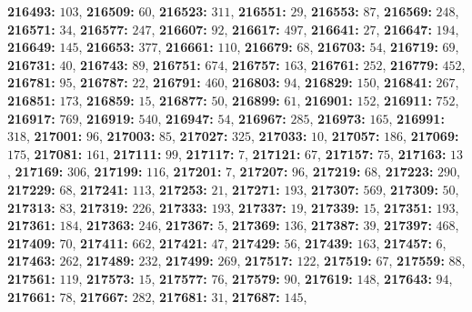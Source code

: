 \textsf{\bfseries 216493:} $103$, \textsf{\bfseries 216509:} $60$, \textsf{\bfseries 216523:} $311$, \textsf{\bfseries 216551:} $29$, \textsf{\bfseries 216553:} $87$, \textsf{\bfseries 216569:} $248$, \textsf{\bfseries 216571:} $34$, \textsf{\bfseries 216577:} $247$, \textsf{\bfseries 216607:} $92$, \textsf{\bfseries 216617:} $497$, \textsf{\bfseries 216641:} $27$, \textsf{\bfseries 216647:} $194$, \textsf{\bfseries 216649:} $145$, \textsf{\bfseries 216653:} $377$, \textsf{\bfseries 216661:} $110$, \textsf{\bfseries 216679:} $68$, \textsf{\bfseries 216703:} $54$, \textsf{\bfseries 216719:} $69$, \textsf{\bfseries 216731:} $40$, \textsf{\bfseries 216743:} $89$, \textsf{\bfseries 216751:} $674$, \textsf{\bfseries 216757:} $163$, \textsf{\bfseries 216761:} $252$, \textsf{\bfseries 216779:} $452$, \textsf{\bfseries 216781:} $95$, \textsf{\bfseries 216787:} $22$, \textsf{\bfseries 216791:} $460$, \textsf{\bfseries 216803:} $94$, \textsf{\bfseries 216829:} $150$, \textsf{\bfseries 216841:} $267$, \textsf{\bfseries 216851:} $173$, \textsf{\bfseries 216859:} $15$, \textsf{\bfseries 216877:} $50$, \textsf{\bfseries 216899:} $61$, \textsf{\bfseries 216901:} $152$, \textsf{\bfseries 216911:} $752$, \textsf{\bfseries 216917:} $769$, \textsf{\bfseries 216919:} $540$, \textsf{\bfseries 216947:} $54$, \textsf{\bfseries 216967:} $285$, \textsf{\bfseries 216973:} $165$, \textsf{\bfseries 216991:} $318$, \textsf{\bfseries 217001:} $96$, \textsf{\bfseries 217003:} $85$, \textsf{\bfseries 217027:} $325$, \textsf{\bfseries 217033:} $10$, \textsf{\bfseries 217057:} $186$, \textsf{\bfseries 217069:} $175$, \textsf{\bfseries 217081:} $161$, \textsf{\bfseries 217111:} $99$, \textsf{\bfseries 217117:} $7$, \textsf{\bfseries 217121:} $67$, \textsf{\bfseries 217157:} $75$, \textsf{\bfseries 217163:} $13$, \textsf{\bfseries 217169:} $306$, \textsf{\bfseries 217199:} $116$, \textsf{\bfseries 217201:} $7$, \textsf{\bfseries 217207:} $96$, \textsf{\bfseries 217219:} $68$, \textsf{\bfseries 217223:} $290$, \textsf{\bfseries 217229:} $68$, \textsf{\bfseries 217241:} $113$, \textsf{\bfseries 217253:} $21$, \textsf{\bfseries 217271:} $193$, \textsf{\bfseries 217307:} $569$, \textsf{\bfseries 217309:} $50$, \textsf{\bfseries 217313:} $83$, \textsf{\bfseries 217319:} $226$, \textsf{\bfseries 217333:} $193$, \textsf{\bfseries 217337:} $19$, \textsf{\bfseries 217339:} $15$, \textsf{\bfseries 217351:} $193$, \textsf{\bfseries 217361:} $184$, \textsf{\bfseries 217363:} $246$, \textsf{\bfseries 217367:} $5$, \textsf{\bfseries 217369:} $136$, \textsf{\bfseries 217387:} $39$, \textsf{\bfseries 217397:} $468$, \textsf{\bfseries 217409:} $70$, \textsf{\bfseries 217411:} $662$, \textsf{\bfseries 217421:} $47$, \textsf{\bfseries 217429:} $56$, \textsf{\bfseries 217439:} $163$, \textsf{\bfseries 217457:} $6$, \textsf{\bfseries 217463:} $262$, \textsf{\bfseries 217489:} $232$, \textsf{\bfseries 217499:} $269$, \textsf{\bfseries 217517:} $122$, \textsf{\bfseries 217519:} $67$, \textsf{\bfseries 217559:} $88$, \textsf{\bfseries 217561:} $119$, \textsf{\bfseries 217573:} $15$, \textsf{\bfseries 217577:} $76$, \textsf{\bfseries 217579:} $90$, \textsf{\bfseries 217619:} $148$, \textsf{\bfseries 217643:} $94$, \textsf{\bfseries 217661:} $78$, \textsf{\bfseries 217667:} $282$, \textsf{\bfseries 217681:} $31$, \textsf{\bfseries 217687:} $145$, 
